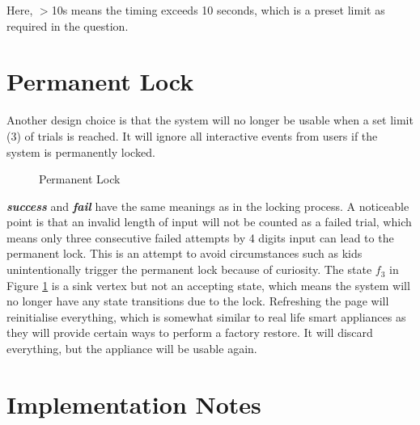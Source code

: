 \documentclass[12pt]{article}
\begin{document}
Here, $>$10s means the timing exceeds 10 seconds, which is a preset limit as required in the question.

\section{Permanent Lock}

Another design choice is that the system will no longer be usable when a set limit (3) of trials is reached. It will ignore all interactive events from users if the system is permanently locked.

\begin{figure}[H]
  \centering
  \caption{Permanent Lock}
  \label{fig:permanent}
\end{figure}

\textbf{\textit{success}} and \textbf{\textit{fail}} have the same meanings as in the locking process. A noticeable point is that an invalid length of input will not be counted as a failed trial, which means only three consecutive failed attempts by 4 digits input can lead to the permanent lock. This is an attempt to avoid circumstances such as kids unintentionally trigger the permanent lock because of curiosity. The state $f_3$ in Figure \ref{fig:permanent} is a sink vertex but not an accepting state, which means the system will no longer have any state transitions due to the lock. Refreshing the page will reinitialise everything, which is somewhat similar to real life smart appliances as they will provide certain ways to perform a factory restore. It will discard everything, but the appliance will be usable again.

\section{Implementation Notes}
\end{document}
